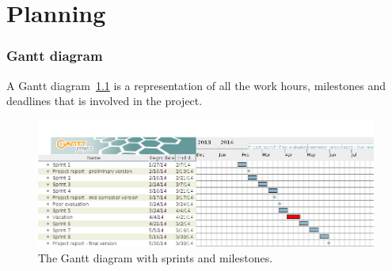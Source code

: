 \chapter{Planning}
\subsection{Gantt diagram}

A Gantt diagram~\ref{fig:gantt} is a representation of all the work hours, milestones and deadlines that is involved in the project. 

\begin{figure}[H]
\includegraphics[width=\textwidth]{ch/planning/fig/gantt.png}
\caption{The Gantt diagram with sprints and milestones.}
\label{fig:gantt}
\end{figure}



\newpage

\newpage

\newpage

